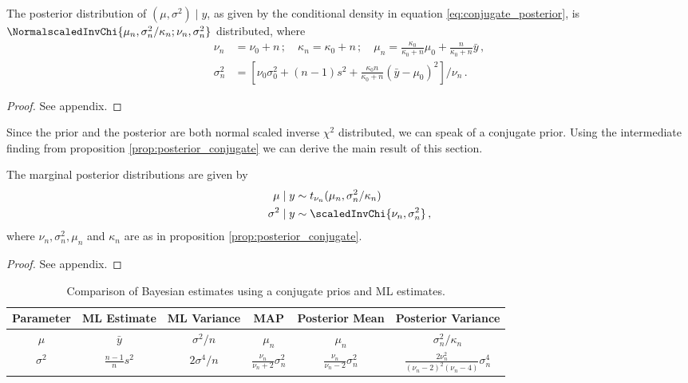 \begin{proposition}
  The posterior distribution of $(\mu, \sigma^2) \mid y$, as given by the conditional density in equation \ref{eq:conjugate_posterior}, is $\NormalscaledInvChi{\mu_n, \sigma_n^2/\kappa_n; \nu_n, \sigma_n^2}$ distributed, where
  \begin{align*}
    \nu_n &= \nu_0 + n \,; \quad \kappa_n = \kappa_0 + n \,; \quad \mu_n =\frac{\kappa_0}{\kappa_0 + n}\mu_0 + \frac{n}{\kappa_0 + n}\bar{y} \,,\\
    \sigma_n^2 &= \left[\nu_0 \sigma_0^2 + (n-1)s^2 + \frac{\kappa_0 n}{\kappa_0 + n} (\bar{y} - \mu_0)^2\right] /\nu_n \,.
  \end{align*}
  \label{prop:posterior_conjugate}
\end{proposition}
\begin{proof}
  See appendix.
\end{proof}

Since the prior and the posterior are both normal scaled inverse $\chi^2$ distributed, we can speak of a conjugate prior.
Using the intermediate finding from proposition \ref{prop:posterior_conjugate} we can derive the main result of this section.

\begin{proposition}\label{prop:marginal_posterior}
  The marginal posterior distributions are given by
  \begin{align*}
    \mu \mid y &\sim t_{\nu_n}(\mu_n, \sigma_n^2 / \kappa_n)\\
    \sigma^2 \mid y &\sim \scaledInvChi{\nu_n, \sigma_n^2}\,,
  \end{align*}
  where $\nu_n, \sigma_n^2, \mu_n$ and $\kappa_n$ are as in proposition \ref{prop:posterior_conjugate}.
\end{proposition}
\begin{proof}
  See appendix.
\end{proof}

\begin{table}[ht]
\centering
\def\arraystretch{1.3}
{\small
 \begin{tabular}{c | c c c c c}
 Parameter & ML Estimate & ML Variance & MAP & Posterior Mean & Posterior Variance\\
 \hline
 $\mu$ & $\bar{y}$ & $\sigma^2 / n$ & $\mu_n$ & $\mu_n$ & $\sigma_n^2 / \kappa_n$\\
 $\sigma^2$ & $\frac{n-1}{n}s^2$ & $2 \sigma^4 / n$ & $\frac{\nu_n}{\nu_n + 2} \sigma_n^2$ & $\frac{\nu_n}{\nu_n - 2} \sigma_n^2$ & $\frac{2 \nu_n^2}{(\nu_n - 2)^2(\nu_n - 4)} \sigma_n^4$
 \end{tabular}
 }
\caption{{\small Comparison of Bayesian estimates using a conjugate prios and ML estimates.}}
\label{tab:comp_conjugate_bay_ml}
\end{table}


